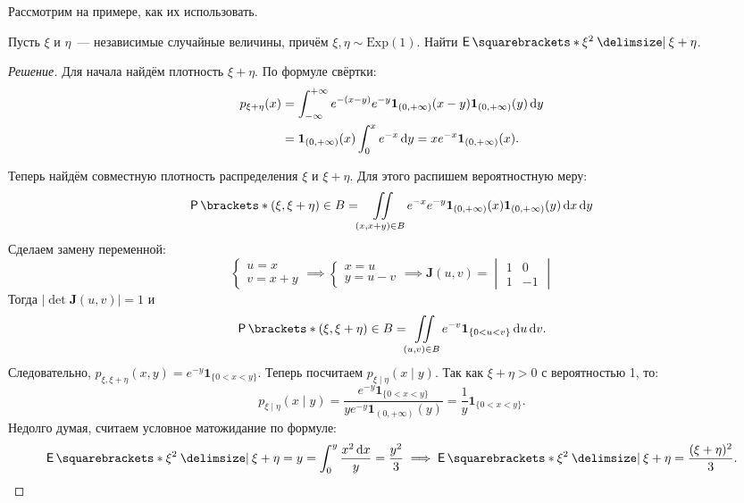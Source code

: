 Рассмотрим на примере, как их использовать.
\begin{problem}
	Пусть \(\xi\) и \(\eta\)~--- независимые случайные величины, причём \(\xi, \eta \sim \mathrm{Exp}(1)\). Найти \(\E{\xi^2 \given \xi + \eta}\).
\end{problem}
\begin{proof}[Решение]
	Для начала найдём плотность \(\xi + \eta\). По формуле свёртки:
	\begin{align*}
		p_{\xi + \eta}(x) &= \int_{-\infty}^{+\infty} e^{-(x - y)}e^{-y}\mathbf{1}_{(0, +\infty)}(x - y)\mathbf{1}_{(0, +\infty)}(y)\mathop{}\!\mathrm{d} y \\
		&= \mathbf{1}_{(0, +\infty)}(x) \int_{0}^{x} e^{-x}\mathop{}\!\mathrm{d} y = xe^{-x}\mathbf{1}_{(0, +\infty)}(x).
	\end{align*}
	
	Теперь найдём совместную плотность распределения \(\xi\) и \(\xi + \eta\). Для этого распишем вероятностную меру:
	\[
		\Pr{(\xi, \xi + \eta) \in B} = \iint\limits_{(x, x + y) \in B} e^{-x}e^{-y}\mathbf{1}_{(0, +\infty)}(x)\mathbf{1}_{(0, +\infty)}(y)\diff x \diff y
	\]
	Сделаем замену переменной:
	\[
		\begin{cases}
			u = x \\
			v = x + y
		\end{cases}
		\implies
		\begin{cases}
			x = u \\
			y = u - v
		\end{cases}
		\implies
		\mathbf{J}(u, v) = 
		\begin{vmatrix}
		1 & 0 \\
		1 & -1
		\end{vmatrix}
	\]
	Тогда \(|\det\mathbf{J}(u, v)| = 1\) и
	\[
		\Pr{(\xi, \xi + \eta) \in B} = \iint\limits_{(u, v) \in B} e^{-v}\mathbf{1}_{\{0 < u < v\}}\diff u \diff v.
	\]
	Следовательно, \(p_{\xi, \xi + \eta}(x, y) = e^{-y}\mathbf{1}_{\{0 < x < y\}}\). Теперь посчитаем \(p_{\xi \mid \eta}(x \mid y)\). Так как \(\xi + \eta > 0\) с вероятностью 1, то:
	\[
		p_{\xi \mid \eta}(x \mid y) = \dfrac{e^{-y}\mathbf{1}_{\{0 < x < y\}}}{ye^{-y}\mathbf{1}_{(0, +\infty)}(y)} = \frac{1}{y}\mathbf{1}_{\{0 < x < y\}}.
	\]
	Недолго думая, считаем условное матожидание по формуле:
	\[
		\E{\xi^2 \given \xi + \eta = y} = \int_{0}^{y}\frac{x^2\diff x}{y} = \frac{y^2}{3} \implies \E{\xi^2 \given \xi + \eta} = \frac{(\xi + \eta)^2}{3}.
	\]
\end{proof}
